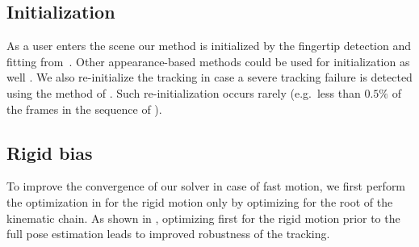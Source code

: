 

\subsection*{Initialization} As a user enters the scene our method is initialized by the fingertip detection and fitting from~\cite{qian2014realtime}.
Other appearance-based methods could be used for initialization as well \cite{tompson2014real}. We also re-initialize the tracking in case a severe tracking failure is detected using the method of \cite{wei_siga12}. Such re-initialization occurs rarely (e.g.\ less than $0.5\%$ of the frames in the sequence of ).


\subsection*{Rigid bias}
To improve the convergence of our solver in case of fast motion, we first perform the optimization in  
for the rigid motion only by optimizing for the root of the kinematic chain. As shown in , optimizing first for the rigid motion prior to the full pose estimation leads to improved robustness of the tracking.

 




